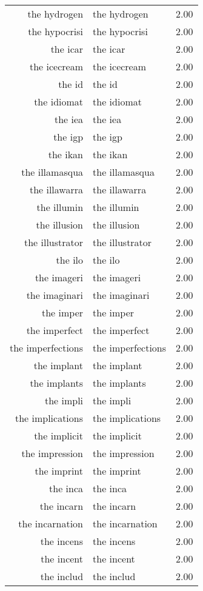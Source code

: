 \begin{table}[ht]
\begin{tabular}{rlr}
  the hydrogen & the hydrogen & 2.00 \\ 
  the hypocrisi & the hypocrisi & 2.00 \\ 
  the icar & the icar & 2.00 \\ 
  the icecream & the icecream & 2.00 \\ 
  the id & the id & 2.00 \\ 
  the idiomat & the idiomat & 2.00 \\ 
  the iea & the iea & 2.00 \\ 
  the igp & the igp & 2.00 \\ 
  the ikan & the ikan & 2.00 \\ 
  the illamasqua & the illamasqua & 2.00 \\ 
  the illawarra & the illawarra & 2.00 \\ 
  the illumin & the illumin & 2.00 \\ 
  the illusion & the illusion & 2.00 \\ 
  the illustrator & the illustrator & 2.00 \\ 
  the ilo & the ilo & 2.00 \\ 
  the imageri & the imageri & 2.00 \\ 
  the imaginari & the imaginari & 2.00 \\ 
  the imper & the imper & 2.00 \\ 
  the imperfect & the imperfect & 2.00 \\ 
  the imperfections & the imperfections & 2.00 \\ 
  the implant & the implant & 2.00 \\ 
  the implants & the implants & 2.00 \\ 
  the impli & the impli & 2.00 \\ 
  the implications & the implications & 2.00 \\ 
  the implicit & the implicit & 2.00 \\ 
  the impression & the impression & 2.00 \\ 
  the imprint & the imprint & 2.00 \\ 
  the inca & the inca & 2.00 \\ 
  the incarn & the incarn & 2.00 \\ 
  the incarnation & the incarnation & 2.00 \\ 
  the incens & the incens & 2.00 \\ 
  the incent & the incent & 2.00 \\ 
  the includ & the includ & 2.00 \\ 

\end{tabular}
\end{table}
